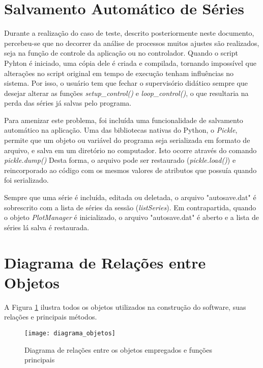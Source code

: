 \section{Salvamento Automático de Séries}

Durante a realização do caso de teste, descrito posteriormente neste documento, percebeu-se que no decorrer da análise de processos muitos ajustes são realizados, seja na função de controle da aplicação ou no controlador. Quando o script Pyhton é iniciado, uma cópia dele é criada e compilada, tornando impossível que alterações no script original em tempo de execução tenham influências no sistema. Por isso, o usuário tem que fechar o supervisório didático sempre que desejar alterar as funções \emph{setup\_control()} e \emph{loop\_control()}, o que resultaria na perda das séries já salvas pelo programa.

Para amenizar este problema, foi incluída uma funcionalidade de salvamento automático na aplicação. Uma das bibliotecas nativas do Python, o \emph{Pickle}, permite que um objeto ou variável do programa seja serializada em formato de arquivo, e salva em um diretório no computador. Isto ocorre através do comando \emph{pickle.dump()} Desta forma, o arquivo pode ser restaurado (\emph{pickle.load()}) e reincorporado ao código com os mesmos valores de atributos que possuía quando foi serializado.

Sempre que uma série é incluída, editada ou deletada, o arquivo "autosave.dat" é sobrescrito com a lista de séries da sessão (\emph{listSeries}). Em contrapartida, quando o objeto \emph{PlotManager} é inicializado, o arquivo "autosave.dat" é aberto e a lista de séries lá salva é restaurada.

\section{Diagrama de Relações entre Objetos}

A Figura \ref{img_diagrama_objetos} ilustra todos os objetos utilizados na construção do software, suas relações e principais métodos.

\begin{figure}[hbt]
	\centering
	\texttt{[image: diagrama\_objetos]}
	\caption{Diagrama de relações entre os objetos empregados e funções principais}
	\label{img_diagrama_objetos}
\end{figure}